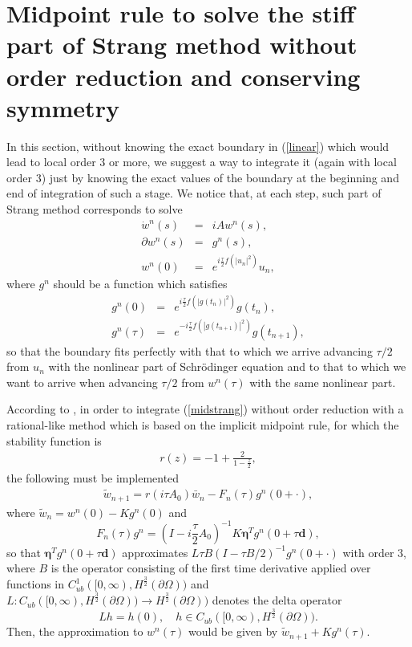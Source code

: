 \documentclass[a4paper,12pt]{article}
\begin{document}
\section{Midpoint rule to solve the stiff part of Strang method without order reduction and conserving symmetry}

In this section, without knowing the exact boundary in (\ref{linear}) which would lead to local order $3$ or more, we suggest a way to integrate it (again with local order $3$) just by knowing the exact values of the boundary at the beginning and end of integration of such a stage.
We notice that, at each step, such part of Strang method corresponds to solve
\begin{eqnarray}
\dot{w}^n(s)&=&i A w^n(s), \nonumber \\
\partial w^n(s)&=& g^n(s), \nonumber \\
w^n(0)&=& e^{i \frac{\tau}{2}f(|u_n|^2)} u_n, \label{midstrang}
\end{eqnarray}
where $g^n$ should be a function which satisfies
\begin{eqnarray}
g^n(0)&=& e^{i \frac{\tau}{2}f(|g(t_n)|^2)} g(t_n), \nonumber \\
g^n(\tau)&=& e^{-i \frac{\tau}{2}f(|g(t_{n+1})|^2)} g(t_{n+1}), \label{known}
\end{eqnarray}
so that the boundary fits perfectly with that to which we arrive advancing $\tau/2$ from $u_n$ with the nonlinear part of Schr\"odinger equation and to that to which we want to arrive when advancing $\tau/2$ from $w^n(\tau)$ with the same nonlinear part.

According to \cite{ACP}, in order to integrate (\ref{midstrang}) without order reduction with a rational-like method which is based on the implicit midpoint rule, for which the stability function is
\begin{eqnarray}
r(z)=-1+\frac{2}{1-\frac{z}{2}},
\label{r}
\end{eqnarray}
the following must be implemented
\begin{eqnarray}
\tilde{w}_{n+1}= r(i \tau A_0) \bar{w}_n- F_n(\tau)g^n(0+\cdot),  \nonumber
\end{eqnarray}
where $\tilde{w}_n=w^n(0)-K g^n(0)$ and
$$F_n(\tau) g^n =(I-i \frac{\tau}{2}A_0)^{-1} K \boldsymbol{\eta}^T  g^n(0+\tau \mathbf{d}),$$
so that
$\boldsymbol{\eta}^T g^n(0+\tau \mathbf{d})$ approximates $L\tau B (I- \tau B/2)^{-1} g^n(0+\cdot)$ with order $3$, where $B$ is the operator consisting of the first time derivative applied over functions in $C^1_{ub}([0,\infty), H^{\frac{3}{2}}(\partial \Omega))$ and $L: C_{ub}([0,\infty),H^{\frac{3}{2}}(\partial \Omega))\to H^{\frac{3}{2}}(\partial \Omega))$ denotes the delta operator
$$L h= h(0), \quad h \in C_{ub}([0,\infty),H^{\frac{3}{2}}(\partial \Omega)).$$
Then, the approximation to $w^n(\tau)$ would be given by $\tilde{w}_{n+1}+ K g^n(\tau)$.
\end{document}
